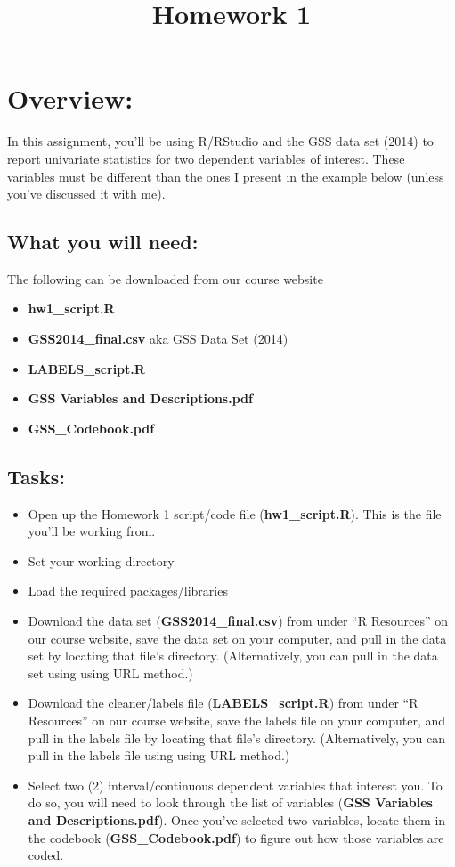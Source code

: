 \documentclass{article}
\begin{document}
\title{Homework 1}
\author[*]{}
\date{}
\maketitle



\section*{Overview:}
In this assignment, you'll be using R/RStudio and the GSS data set (2014) to report univariate statistics for two dependent variables of interest. These variables must be different than the ones I present in the example below (unless you've discussed it with me).

\subsection*{What you will need:}
The following can be downloaded from our course website
\begin{itemize}
\item \textbf{hw1\_script.R}
\item \textbf{GSS2014\_final.csv} aka GSS Data Set (2014)
\item \textbf{LABELS\_script.R}
\item \textbf{GSS Variables and Descriptions.pdf}
\item \textbf{GSS\_Codebook.pdf}
\end{itemize}


\subsection*{Tasks:}
\begin{itemize}
\item Open up the Homework 1 script/code file (\textbf{hw1\_script.R}). This is the file you'll be working from.
\item Set your working directory
\item Load the required packages/libraries
\item Download the data set (\textbf{GSS2014\_final.csv}) from under ``R Resources'' on our course website, save the data set on your computer, and pull in the data set by locating that file's directory. (Alternatively, you can pull in the data set using using URL method.)
\item Download the cleaner/labels file (\textbf{LABELS\_script.R}) from under ``R Resources'' on our course website, save the labels file on your computer, and pull in the labels file by locating that file's directory. (Alternatively, you can pull in the labels file using using URL method.)
\item Select two (2) interval/continuous dependent variables that interest you. To do so, you will need to look through the list of variables (\textbf{GSS Variables and Descriptions.pdf}). Once you've selected two variables, locate them in the codebook (\textbf{GSS\_Codebook.pdf}) to figure out how those variables are coded.
\end{itemize}
\end{document}
